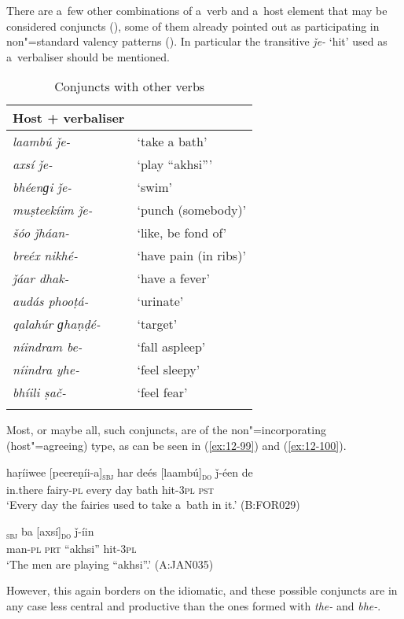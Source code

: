  There are a~few other combinations of a~verb and a~host element that may be considered conjuncts (), some of them already pointed out as participating in non"=standard valency patterns (). In particular the transitive \textit{ǰe-} `hit' used as a~verbaliser should be mentioned.


\begin{table}[ht]
\caption{Conjuncts with other verbs}
\begin{tabularx}{.75\textwidth}{ l@{\hspace{45pt}} Q }
\lspbottomrule
\textbf{Host + verbaliser} &
\\\hline
\textit{laambú ǰe-} &
`take a bath'\\
\textit{axsí ǰe-} &
`play ``akhsi'''\\
\textit{bhéenɡi ǰe-} &
`swim'\\
\textit{muṣteekíim ǰe-} &
`punch (somebody)'\\
\textit{šóo ǰháan-} &
`like, be fond of'\\
\textit{breéx nikhé-} &
`have pain (in ribs)'\\
\textit{ǰáar dhak-} &
`have a fever'\\
\textit{audás phooṭá-} &
`urinate'\\
\textit{qalahúr ɡhaṇḍé-} &
`target'\\
\textit{níindram be-} &
`fall aspleep'\\
\textit{níindra yhe-} &
`feel sleepy'\\
\textit{bhíili ṣač-} &
`feel fear'\\\lspbottomrule
\end{tabularx}
\label{tab:12-9}
\end{table}


Most, or maybe all, such conjuncts, are of the non"=incorporating (host"=agreeing) type, as can be seen in (\ref{ex:12-99}) and (\ref{ex:12-100}). 

\begin{exe}
\ex
\label{ex:12-99}
\gll haṛíiwee [peereṇíi-a]\textsubscript{\textsc{sbj}} har deés [laambú]\textsubscript{\textsc{do}} ǰ-éen de \\
in.there fairy-\textsc{pl} every day bath hit-\textsc{3pl} \textsc{pst} \\
\glt `Every day the fairies used to take a~bath in it.' (B:FOR029)
\end{exe}
\begin{exe}
\ex
\label{ex:12-100}
\gll [míiš-a]\textsubscript{\textsc{sbj}} ba [axsí]\textsubscript{\textsc{do}} ǰ-íin  \\
man-\textsc{pl} \textsc{prt} ``akhsi'' hit-\textsc{3pl} \\
\glt `The men are playing ``akhsi''.' (A:JAN035)
\end{exe}

However, this again borders on the idiomatic, and these possible conjuncts are in any case less central and productive than the ones formed with \textit{the-} and \textit{bhe-}.